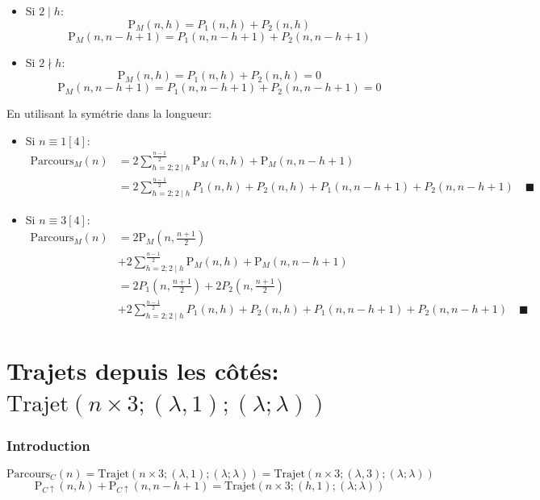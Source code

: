 \documentclass[twoside, a4paper, 12pt]{report}
\newcommand{\cqfd}[1][\quad]{\ensuremath{#1\blacksquare}}
\newcommand{\trajet}[6]{\ensuremath{\text{Trajet}\left(#1 \times #2; (#3, #4); (#5; #6)\right)}}
\newcommand{\Pm}[1]{\ensuremath{\text{P}_M\left(#1\right)}}
\newcommand{\Pmtot}[1]{\ensuremath{\text{Parcours}_M\left(#1\right)}}
\newcommand{\Pc}[1]{\ensuremath{\text{P}_{C\uparrow}(#1)}}
\newcommand{\Pctot}[1]{\ensuremath{\text{Parcours}_C(#1)}}
\begin{document}
\begin{itemize}
\begin{itemize}
\item Si $2 \mid h$:
$$\Pm{n, h} = P_1(n, h) + P_2(n, h)$$
$$\Pm{n, n-h+1} = P_1(n, n-h+1) + P_2(n, n-h+1)$$

\item Si $2 \nmid h$:
$$\Pm{n, h} = P_1(n, h) + P_2(n, h) = 0$$
$$\Pm{n, n-h+1} = P_1(n, n-h+1) + P_2(n, n-h+1) = 0$$
\end{itemize}

En utilisant la symétrie dans la longueur:
\begin{itemize}
\item Si $n \equiv 1 [4]$:
\begin{align}
\Pmtot{n} &= 2\sum_{h=2; 2 \mid h}^{\frac{n-1}{2}} \Pm{n, h} + \Pm{n, n-h+1}\\
&= 2\sum_{h=2; 2 \mid h}^{\frac{n-1}{2}} P_1(n, h) + P_2(n, h) +  P_1(n, n-h+1) + P_2(n, n-h+1) \cqfd
\end{align}
\item Si $n \equiv 3 [4]$:
\begin{align}
\Pmtot{n} 
&= 2\Pm{n, \frac{n+1}{2}} \\
&+ 2 \sum_{h=2; 2 \mid h}^{\frac{n-1}{2}} \Pm{n, h} + \Pm{n, n-h+1}\\
&= 2P_1\left(n, \frac{n+1}{2} \right) +  2P_2\left(n, \frac{n+1}{2} \right)\\
&+ 2 \sum_{h=2; 2 \mid h}^{\frac{n-1}{2}} P_1(n, h) + P_2(n, h) +  P_1(n, n-h+1) + P_2(n, n-h+1) \cqfd
\end{align}
\end{itemize}
\end{itemize}


\section{Trajets depuis les côtés: \trajet{n}{3}{\lambda}{1}{\lambda}{\lambda}}
\subsubsection{Introduction}
$$\Pctot{n} = \trajet{n}{3}{\lambda}{1}{\lambda}{\lambda} = \trajet{n}{3}{\lambda}{3}{\lambda}{\lambda}$$
$$\Pc{n, h} + \Pc{n, n-h+1} = \trajet{n}{3}{h}{1}{\lambda}{\lambda}$$
\end{document}
